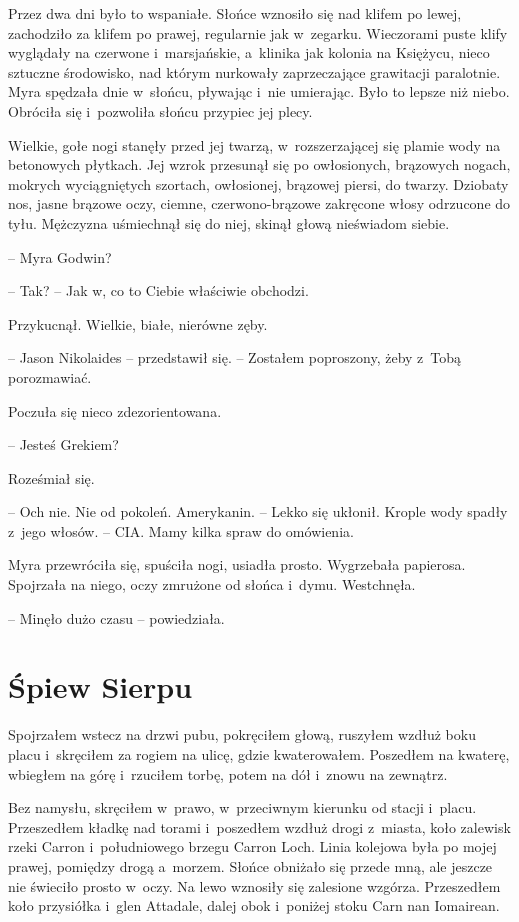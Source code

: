 \documentclass[oneside,polish,11pt,sfheadings]{mwbk}
\begin{document}
Przez dwa dni było to wspaniałe. Słońce wznosiło się nad klifem po
lewej, zachodziło za klifem po prawej, regularnie jak w~zegarku.
Wieczorami puste klify wyglądały na czerwone i~marsjańskie, a~klinika
jak kolonia na Księżycu, nieco sztuczne środowisko, nad którym nurkowały
zaprzeczające grawitacji paralotnie. Myra spędzała dnie w~słońcu,
pływając i~nie umierając. Było to lepsze niż niebo. Obróciła się i~pozwoliła słońcu przypiec jej plecy.

Wielkie, gołe nogi stanęły przed jej twarzą, w~rozszerzającej się plamie
wody na betonowych płytkach. Jej wzrok przesunął się po owłosionych,
brązowych nogach, mokrych wyciągniętych szortach, owłosionej, brązowej
piersi, do twarzy. Dziobaty nos, jasne brązowe oczy, ciemne,
czerwono-brązowe zakręcone włosy odrzucone do tyłu. Mężczyzna uśmiechnął
się do niej, skinął głową nieświadom siebie.

-- Myra Godwin?

-- Tak? -- Jak w, co to Ciebie właściwie obchodzi.

Przykucnął. Wielkie, białe, nierówne zęby.

-- Jason Nikolaides -- przedstawił się. -- Zostałem poproszony, żeby z~Tobą
porozmawiać.

Poczuła się nieco zdezorientowana.

-- Jesteś Grekiem?

Roześmiał się. 

-- Och nie. Nie od pokoleń. Amerykanin. -- Lekko się
ukłonił. Krople wody spadły z~jego włosów. -- CIA. Mamy kilka spraw do
omówienia.

Myra przewróciła się, spuściła nogi, usiadła prosto. Wygrzebała
papierosa. Spojrzała na niego, oczy zmrużone od słońca i~dymu.
Westchnęła.

-- Minęło dużo czasu -- powiedziała.

\chapter{Śpiew Sierpu}

Spojrzałem wstecz na drzwi pubu, pokręciłem głową, ruszyłem wzdłuż boku
placu i~skręciłem za rogiem na ulicę, gdzie kwaterowałem. Poszedłem na
kwaterę, wbiegłem na górę i~rzuciłem torbę, potem na dół i~znowu na
zewnątrz.

Bez namysłu, skręciłem w~prawo, w~przeciwnym kierunku od stacji i~placu.
Przeszedłem kładkę nad torami i~poszedłem wzdłuż drogi z~miasta, koło
zalewisk rzeki Carron i~południowego brzegu Carron Loch. Linia kolejowa
była po mojej prawej, pomiędzy drogą a~morzem. Słońce obniżało się
przede mną, ale jeszcze nie świeciło prosto w~oczy. Na lewo wznosiły się
zalesione wzgórza. Przeszedłem koło przysiółka i~glen Attadale, dalej
obok i~poniżej stoku Carn nan Iomairean.
\end{document}
